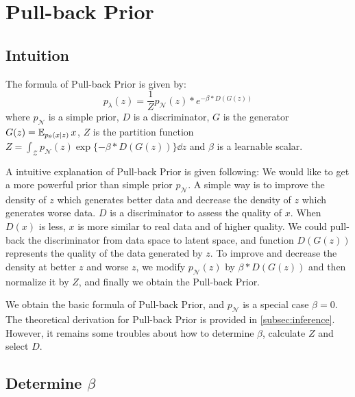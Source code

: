 
\section{Pull-back Prior}\label{sec:pull_back_prior}

\subsection{Intuition}\label{subsec:intuition}

The formula of Pull-back Prior is given by:
\begin{equation}\label{eq:pull_back_prior}
	p_\lambda(z) = \frac{1}{Z} p_\mathcal{N}(z) * e^{- \beta * D(G(z))} \tag{4}
\end{equation}
where $p_\mathcal{N}$ is a simple prior, $D$ is a discriminator, $G$ is the generator $G(z) = \operatorname{\mathbb{E}}_{p_\theta(x|z)} x$, $Z$ is the partition function $Z = \int_{\mathcal{Z}} p_\mathcal{N}(z) \exp\{- \beta * D(G(z))\} \dd z$ and $\beta$ is a learnable scalar.

A intuitive explanation of Pull-back Prior is given following: We would like to get a more powerful prior than simple prior $p_\mathcal{N}$. A simple way is to improve the density of $z$ which generates better data and decrease the density of $z$ which generates worse data. $D$ is a discriminator to assess the quality of $x$. When $D(x)$ is less, $x$ is more similar to real data and of higher quality. We could pull-back the discriminator from data space to latent space, and function $D(G(z))$ represents the quality of the data generated by $z$. To improve and decrease the density at better $z$ and worse $z$, we modify $p_\mathcal{N}(z)$ by $\beta * D(G(z))$ and then normalize it by $Z$, and finally we obtain the Pull-back Prior. 

We obtain the basic formula of Pull-back Prior, and $p_\mathcal{N}$ is a special case $\beta = 0$. The theoretical derivation for Pull-back Prior is provided in \cref{subsec:inference}. However, it remains some troubles about how to determine $\beta$, calculate $Z$ and select $D$. 

\subsection{Determine $\beta$}\label{subsec:determine_beta}

